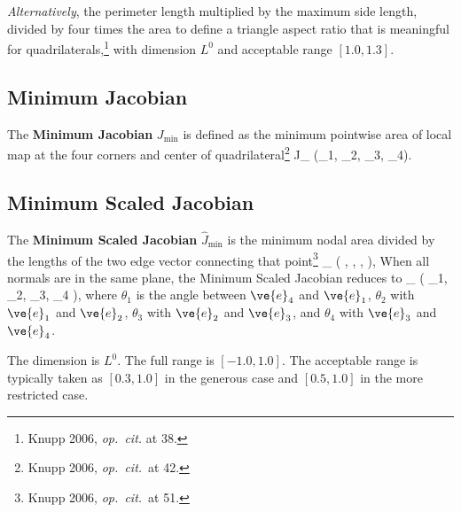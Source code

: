 \documentclass[14pt,letterpaper,fleqn]{extreport}
\begin{document}
{\em Alternatively}, the perimeter length multiplied by the maximum side length, 
divided by four times the area to define a triangle aspect ratio that is 
meaningful for quadrilaterals,\footnote{Knupp 2006, {\em op.~cit.} at 38.} with 
dimension $L^0$ and acceptable range $[1.0, 1.3]$.


\subsection{Minimum Jacobian}
The {\bf Minimum Jacobian} $J_{\min}$ is defined as the minimum pointwise area of local 
map at the four corners and center of quadrilateral\footnote{Knupp 2006, {\em op.~cit.}~at 42.}
\be 
J_{\min}  \min \left(\alpha_1, \alpha_2, \alpha_3, \alpha_4\right).
\ee 

\subsection{Minimum Scaled Jacobian}

The {\bf Minimum Scaled Jacobian} $\hat{J}_{\min}$ is the minimum nodal area divided by the 
lengths of the two edge vector connecting that point\footnote{Knupp 2006, {\em op.~cit.}~at 51.}
\be 
{}_{\min}  \min
  \left(
    , 
    ,
    ,
  \right),
\ee 
%
When all normals are in the same plane, the Minimum Scaled Jacobian reduces to 
\be 
{}_{\min}  \; \min
  \left(
    \sin \theta_1, \sin \theta_2, \sin \theta_3, \sin \theta_4
  \right),
\ee 
where $\theta_1$ is the angle between $\ve{e}_4$ and $\ve{e}_1$, 
$\theta_2$ with $\ve{e}_1$ and $\ve{e}_2$, 
$\theta_3$ with $\ve{e}_2$ and $\ve{e}_3$, and
$\theta_4$ with $\ve{e}_3$ and $\ve{e}_4$.

The dimension is $L^0$.  
The full range is  $[-1.0, 1.0]$.  
The acceptable range is typically taken as $[0.3, 1.0]$ in the generous case and 
$[0.5, 1.0]$ in the more restricted case.
\end{document}
